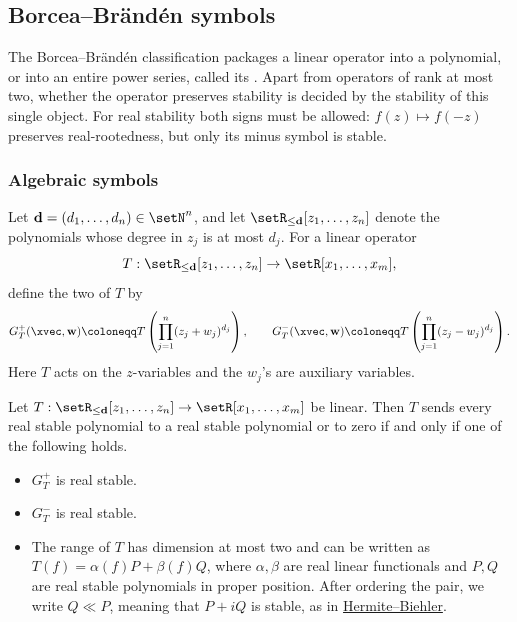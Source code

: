 \subsection[borceaBrandenSymbols]{Borcea--Brändén symbols}

The Borcea--Brändén classification packages a linear operator into a
polynomial, or into an entire power series, called its
\label{stabilitySymbol}.  Apart from operators of rank at
most two, whether the operator preserves stability is decided by the
stability of this single object.  For
real stability both signs must be allowed: \(f(z)\mapsto f(-z)\) preserves
real-rootedness, but only its minus symbol is stable.

\subsubsection[algebraicStabilitySymbols]{Algebraic symbols}

\begin{definition}
Let $\mathbf{d}=(d_1,\dotsc,d_n) \in \setN^n$, and let
$\setR_{\leq \mathbf{d}}[z_1,\dotsc,z_n]$ denote the polynomials whose degree
in $z_j$ is at most $d_j$.
For a linear operator
\[
 T:\setR_{\leq \mathbf{d}}[z_1,\dotsc,z_n]\to \setR[x_1,\dotsc,x_m],
\]
define the two \label{algebraicSymbol} of $T$ by
\[
 G_T^{+}(\xvec,\mathbf{w})
 \coloneqq
 T\left( \prod_{j=1}^n (z_j+w_j)^{d_j} \right),
 \qquad
 G_T^{-}(\xvec,\mathbf{w})
 \coloneqq
 T\left( \prod_{j=1}^n (z_j-w_j)^{d_j} \right).
\]
Here $T$ acts on the $z$-variables and the $w_j$'s are auxiliary variables.
\end{definition}

\begin{theorem}
\label{borceaBrandenFiniteSymbol}
Let \(T:\setR_{\leq \mathbf{d}}[z_1,\dotsc,z_n]\to
\setR[x_1,\dotsc,x_m]\) be linear.  Then \(T\) sends every real stable
polynomial to a real stable polynomial or to zero if and only if one of the
following holds.
\begin{itemize}
\item \(G_T^{+}\) is real stable.
\item \(G_T^{-}\) is real stable.
\item The range of \(T\) has dimension at most two and can be written as
  \(T(f)=\alpha(f)P+\beta(f)Q\), where \(\alpha,\beta\) are real linear
  functionals and \(P,Q\) are real stable polynomials in proper position.
  After ordering the pair, we write \(Q\ll P\), meaning that
  \(P+iQ\) is stable, as in \hyperref[hermiteBiehler]{Hermite--Biehler}.
\end{itemize}
\end{theorem}

